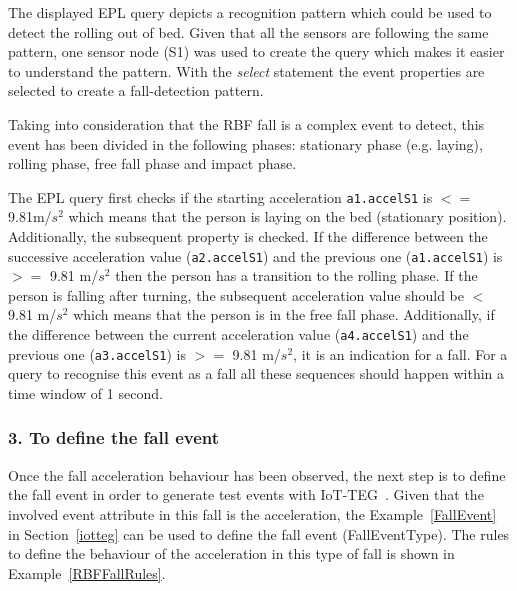 \documentclass[journal]{IEEEtran}
\begin{document}
The displayed EPL query depicts a recognition pattern which could be used to detect the rolling out of bed. Given that all the sensors are following the same pattern, one sensor node (S1) was used to create the query which makes it easier to understand the pattern. With the \textit{select} statement the event properties are selected to create a fall-detection pattern.

Taking into consideration that the RBF fall is a complex event to detect, this event has been divided in the following phases: stationary phase (e.g. laying), rolling phase, free fall phase and impact phase.

The EPL query first checks if the starting acceleration \texttt{\small{a1.accelS1}} is $<=$ 9.81m/$s^2$ which means that the person is laying 
on the bed (stationary position). Additionally, the subsequent property is checked. If the difference between the successive 
acceleration value (\texttt{\small{a2.accelS1}}) and the previous one (\texttt{\small{a1.accelS1}}) is $>=$ 9.81 m/$s^2$ then the person has a transition to 
the rolling phase. If the person is falling after turning, the subsequent acceleration value should be $<$ 9.81 m/$s^2$ 
which means that the person is in the free fall phase. Additionally, if the difference between the current acceleration value 
(\texttt{\small{a4.accelS1}}) and the previous one (\texttt{\small{a3.accelS1}}) is
$>=$ 9.81 m/$s^2$, it is an indication for a fall. For a query to
recognise this event as a fall all these sequences should happen within a time window of 1 second.

\subsubsection*{3. To define the fall event} Once the fall acceleration behaviour has been observed, the next step is to define the 
fall event in order to generate test events with IoT-TEG~\cite{TesisGutierrez2017,Gutierrez2017}. Given that the involved event 
attribute in this fall is the acceleration, the Example~\ref{FallEvent} in Section~\ref{iotteg} can be used to define 
the fall event (FallEventType). The rules to define the behaviour of the acceleration in this type of fall is shown in 
Example~\ref{RBFFallRules}.
\end{document}
